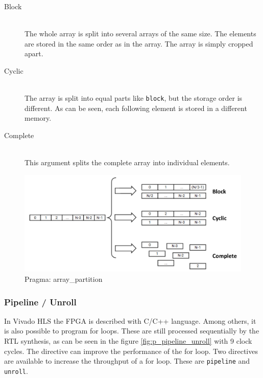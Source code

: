 \begin{description}
\item[Block]\hfill \\
The whole array is split into several arrays of the same size. The elements are stored in the same order as in the array. The array is simply cropped apart.
\item[Cyclic]\hfill \\ 
The array is split into equal parts like \texttt{block}, but the storage order is different. As can be seen, each following element is stored in a different memory. 
\item[Complete]\hfill \\ 
This argument splits the complete array into individual elements.
\end{description}


\begin{figure}[tb!]
    \centering
    \includegraphics[width=\textwidth]{images/theory/array_partition.png}
    \caption{Pragma: array\_partition}
    \label{fig:p_array_partition}
\end{figure}

\subsubsection*{Pipeline / Unroll}
In Vivado HLS the FPGA is described with C/C++ language. Among others, it is also possible to program for loops. These are still processed sequentially by the RTL synthesis, as can be seen in the figure \ref{fig:p_pipeline_unroll} with 9 clock cycles. The directive can improve the performance of the for loop. Two directives are available to increase the throughput of a for loop. These are \texttt{pipeline} and \texttt{unroll}.

